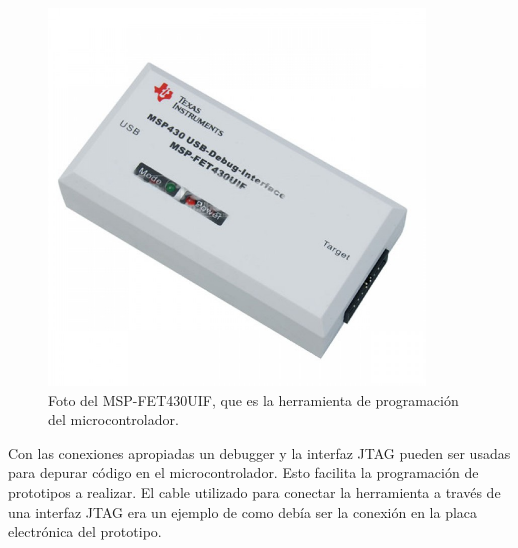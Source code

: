 \begin{figure}[!h]
	\centering
	\includegraphics[width=100mm,keepaspectratio]{Figures/emeesepeFET.jpg}
	\caption{ Foto del MSP-FET430UIF, que es la herramienta de programación del microcontrolador.}
	\label{fig:mspFETtool}
\end{figure}

Con las conexiones apropiadas un debugger y la interfaz JTAG pueden ser usadas para depurar código en el microcontrolador. Esto facilita la programación de prototipos a realizar. El cable utilizado para conectar la herramienta a través de una interfaz JTAG era un ejemplo de como debía ser la conexión en la placa electrónica del prototipo.



